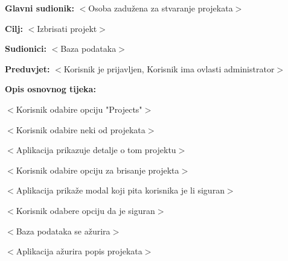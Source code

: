 					\noindent {}
					\begin{packed_item}
					
						\item \textbf{Glavni sudionik:} $<$Osoba zadužena za stvaranje projekata$>$
						\item \textbf{Cilj:} $<$Izbrisati projekt$>$
						\item \textbf{Sudionici:} $<$Baza podataka$>$
						\item \textbf{Preduvjet:} $<$Korisnik je prijavljen, Korisnik ima ovlasti administrator$>$
						\item \textbf{Opis osnovnog tijeka:}
					
						\item[] \begin{packed_enum}

							\item $<$Korisnik odabire opciju "Projects"$>$
							\item $<$Korisnik odabire neki od projekata$>$
							\item $<$Aplikacija prikazuje detalje o tom projektu$>$
							\item $<$Korisnik odabire opciju za brisanje projekta$>$
							\item $<$Aplikacija prikaže modal koji pita korisnika je li siguran$>$
							\item $<$Korisnik odabere opciju da je siguran$>$
							\item $<$Baza podataka se ažurira$>$
							\item $<$Aplikacija ažurira popis projekata$>$
						\end{packed_enum}
					
					\end{packed_item}

